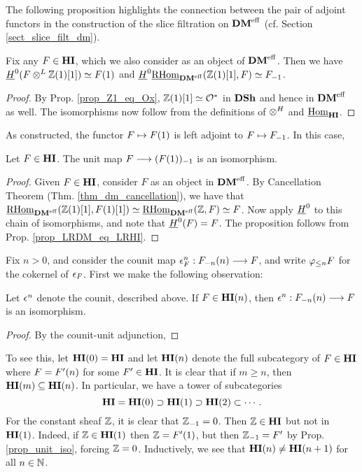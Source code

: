 The following proposition highlights the connection between the
pair of adjoint functors in the construction of the slice 
filtration on $\DMeff$ (cf.  Section \ref{sect_slice_filt_dm}).

\begin{prop}\label{prop_LRDM_eq_LRHI}
Fix any $F \in \HI$, which we also consider as an object of 
$\DMeff$. Then we have $\sheaf{H}^0(F \tDM \Z(1)[1]) \simeq 
\LHI{F}$ and $\sheaf{H}^0\ihomDMf(\Z(1)[1], F) \simeq \RHI{F}$.
\end{prop}
\begin{proof}
By Prop. \ref{prop_Z1_eq_Ox}, $\Z(1)[1] \simeq \Ox$ in $\DSh$
and hence in $\DMeff$ as well. The isomorphisms now follow
from the definitions of $\tHI$ and $\ihomHI$.
\end{proof}

As constructed, the functor $F \mapsto \LHI{F}$ is left adjoint to 
$F \mapsto \RHI{F}$. In this case,

\begin{prop}\label{prop_unit_iso}
Let $F \in \HI$. The unit map $F \to \RHI{(\LHI{F})}$ is an
isomorphism.
\end{prop}
\begin{proof}
Given $F \in \HI$, consider $F$ as an object in $\DMeff$. By
Cancellation Theorem (Thm. \ref{thm_dm_cancellation}), we have
that $\ihomDMf(\Z(1)[1], F(1)[1]) \simeq \ihomDMf(\Z, F) 
\simeq F$. Now apply $\sheaf{H}^0$ to this chain of isomorphisms,
and note that $\sheaf{H}^0(F) = F$. The proposition follows from 
Prop. \ref{prop_LRDM_eq_LRHI}.
\end{proof}

Fix $n > 0$, and consider the counit map $\cuHI_F^n: 
\LHI[n]{\RHI[n]{F}} \to F$, and write $\tlHI{n} F$ for the 
cokernel of $\cuHI_F$. First we make the following observation:

\begin{prop}\label{prop_counit_iso_for_HIn}
Let $\cuHI^n$ denote the counit, described above. If $F \in 
\LHI[n]{\HI}$, then $\cuHI^n : \LHI[n]{\RHI[n]{F}} \to F$ is
an isomorphism.
\end{prop}
\begin{proof}
By the counit-unit adjunction, 
\end{proof}

To see this, let $\LHI[0]{\HI} = \HI$ and let $\LHI[n]{\HI}$ 
denote the full subcategory of $F \in \HI$ where $F = \LHI[n]{F'}$ 
for some $F' \in \HI$. It is clear that if $m \geq n$, then 
$\LHI[m]{\HI} \subseteq \LHI[n]{\HI}$. In particular, we have a 
tower of subcategories
\[
\HI = \LHI[0]{\HI} \supset \LHI[1]{\HI} \supset \LHI[2]{\HI} 
\subset \cdots.
\]
For the constant sheaf $\Z$, it is clear that $\RHI{\Z} = 0$. 
Then $\Z \in \HI$ but not in $\LHI{\HI}$. Indeed, if $\Z \in 
\LHI{\HI}$ then $\Z = \LHI{F'}$, but then $\RHI{\Z} = F'$ by Prop. 
\ref{prop_unit_iso}, forcing $\Z = 0$. Inductively, we see 
that $\LHI[n]{\HI} \neq \LHI[n + 1]{\HI}$ for all $n \in \N$.

